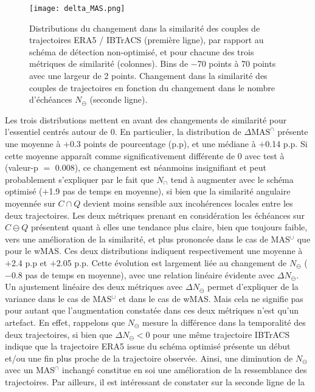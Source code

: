\documentclass[../main.tex]{subfiles}
\begin{document}
\begin{figure}[htb]
    \centering
    \texttt{[image: delta\_MAS.png]}
    \caption{Distributions du changement dans la similarité des couples de trajectoires ERA5 / IBTrACS (première ligne), par rapport au schéma de détection
    non-optimisé, et pour chacune des trois métriques de similarité (colonnes). Bins de \num{-70} points à \num{70} points avec une largeur de \num{2}
    points. Changement dans la similarité des couples de trajectoires en fonction du changement dans le nombre d'échéances $N_\ominus$ (seconde ligne).}
    \label{fig:delta_MAS}
\end{figure}

Les trois distributions mettent en avant des changements de similarité pour l'essentiel centrés autour de \num{0}. En particulier, la distribution de $\Delta
\text{MAS}^\cap$ présente une moyenne à $+$\num{0.3} points de pourcentage (p.p), et une médiane à $+$\num{0.14} p.p. Si cette moyenne apparaît comme
significativement différente de \num{0} avec test à  (valeur-p $=$ \num{0.008}), ce changement est néanmoins insignifiant et peut probablement
s'expliquer par le fait que $N_\cap$ tend à augmenter avec le schéma optimisé ($+$\num{1.9} pas de temps en moyenne), si bien que la similarité angulaire
moyennée sur $C \cap Q$ devient moins sensible aux incohérences locales entre les deux trajectoires. Les deux métriques prenant en considération les échéances
sur $C \ominus Q$ présentent quant à elles une tendance plus claire, bien que toujours faible, vers une amélioration de la similarité, et plus prononcée dans le
cas de MAS$^\cup$ que pour le wMAS. Ces deux distributions indiquent respectivement une moyenne à $+$\num{2.4} p.p et $+$\num{2.05} p.p. Cette évolution est
largement liée au changement de $N_\ominus$ ($-$\num{0.8} pas de temps en moyenne), avec une relation linéaire évidente avec $\Delta N_\ominus$. Un ajustement
linéaire des deux métriques avec $\Delta N_\ominus$ permet d'expliquer  de la variance dans le cas de MAS$^\cup$ et  dans le cas de wMAS. Mais
cela ne signifie pas pour autant que l'augmentation constatée dans ces deux métriques n'est qu'un artefact. En effet, rappelons que $N_\ominus$ mesure la
différence dans la temporalité des deux trajectoires, si bien que $\Delta N_\ominus < 0$ pour une même trajectoire IBTrACS indique que la trajectoire ERA5 issue
du schéma optimisé présente un début et/ou une fin plus proche de la trajectoire observée. Ainsi, une diminution de $N_\ominus$ avec un MAS$^\cap$ inchangé
constitue en soi une amélioration de la ressemblance des trajectoires. Par ailleurs, il est intéressant de constater sur la seconde ligne de la
\end{document}
